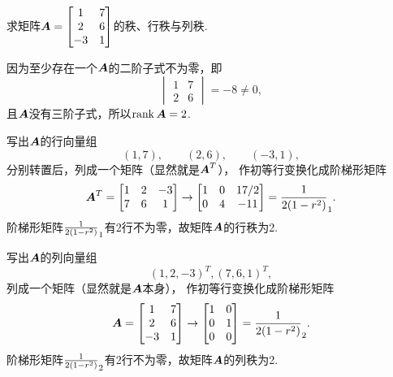 \begin{example}
求矩阵\(\boldsymbol{A} = \begin{bmatrix} 1 & 7 \\ 2 & 6 \\ -3 & 1 \end{bmatrix}\)的秩、行秩与列秩.
\begin{solution}
因为至少存在一个\(\boldsymbol{A}\)的二阶子式不为零，即\[
	\begin{vmatrix} 1 & 7 \\ 2 & 6 \end{vmatrix} = -8 \neq 0,
\]
且\(\boldsymbol{A}\)没有三阶子式，所以\(\rank\boldsymbol{A} = 2\).

写出\(\boldsymbol{A}\)的行向量组\[
	(1,7), \qquad
	(2,6), \qquad
	(-3,1),
\]
分别转置后，列成一个矩阵（显然就是\(\boldsymbol{A}^T\)），
作初等行变换化成阶梯形矩阵\[
	\boldsymbol{A}^T = \begin{bmatrix}
		1 & 2 & -3 \\
		7 & 6 & 1
	\end{bmatrix} \to \begin{bmatrix}
		1 & 0 & 17/2 \\
		0 & 4 & -11
	\end{bmatrix} = \frac{1}{2(1-r^2)}_1.
\]阶梯形矩阵\(\frac{1}{2(1-r^2)}_1\)有2行不为零，故矩阵\(\boldsymbol{A}\)的行秩为2.

写出\(\boldsymbol{A}\)的列向量组\[
	(1,2,-3)^T,
	(7,6,1)^T,
\]列成一个矩阵（显然就是\(\boldsymbol{A}\)本身），
作初等行变换化成阶梯形矩阵\[
	\boldsymbol{A} = \begin{bmatrix} 1 & 7 \\ 2 & 6 \\ -3 & 1 \end{bmatrix}
	\to \begin{bmatrix} 1 & 0 \\ 0 & 1 \\ 0 & 0 \end{bmatrix} = \frac{1}{2(1-r^2)}_2.
\]
阶梯形矩阵\(\frac{1}{2(1-r^2)}_2\)有2行不为零，故矩阵\(\boldsymbol{A}\)的列秩为2.
\end{solution}
\end{example}

